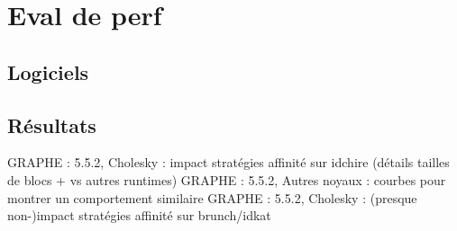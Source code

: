 \section{Eval de perf}
\subsection{Logiciels}
\subsection{Résultats}

GRAPHE : 5.5.2, Cholesky : impact stratégies affinité sur idchire (détails tailles de blocs + vs autres runtimes)
GRAPHE : 5.5.2, Autres noyaux : courbes pour montrer un comportement similaire
GRAPHE : 5.5.2, Cholesky : (presque non-)impact stratégies affinité sur brunch/idkat

